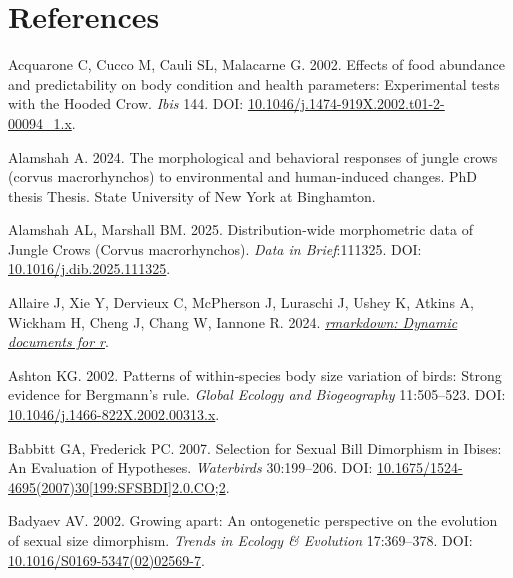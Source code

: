 \documentclass[10pt,a4paper]{article}
\newlength{\cslhangindent}
\newenvironment{CSLReferences}[2] %
 {\begin{list}{}{%
  \setlength{\itemindent}{0pt}
  \setlength{\leftmargin}{0pt}
  \setlength{\parsep}{0pt}
  \ifodd #1
   \setlength{\leftmargin}{\cslhangindent}
   \setlength{\itemindent}{-1\cslhangindent}
  \fi
  \setlength{\itemsep}{#2\baselineskip}}}
 {\end{list}}
\begin{document}
\clearpage

\section*{References}\label{references}

\label{refs}
\begin{CSLReferences}{1}{0}
Acquarone C, Cucco M, Cauli SL, Malacarne G. 2002. Effects of food abundance and predictability on body condition and health parameters: Experimental tests with the {Hooded} {Crow}. \emph{Ibis} 144. DOI: \href{https://doi.org/10.1046/j.1474-919X.2002.t01-2-00094_1.x}{10.1046/j.1474-919X.2002.t01-2-00094\_1.x}.

Alamshah A. 2024. The morphological and behavioral responses of jungle crows (corvus macrorhynchos) to environmental and human-induced changes. PhD thesis Thesis. State University of New York at Binghamton.

Alamshah AL, Marshall BM. 2025. Distribution-wide morphometric data of {Jungle} {Crows} ({Corvus} macrorhynchos). \emph{Data in Brief}:111325. DOI: \href{https://doi.org/10.1016/j.dib.2025.111325}{10.1016/j.dib.2025.111325}.

Allaire J, Xie Y, Dervieux C, McPherson J, Luraschi J, Ushey K, Atkins A, Wickham H, Cheng J, Chang W, Iannone R. 2024. \emph{\href{https://github.com/rstudio/rmarkdown}{{rmarkdown}: Dynamic documents for r}}.

Ashton KG. 2002. Patterns of within‐species body size variation of birds: Strong evidence for {Bergmann}'s rule. \emph{Global Ecology and Biogeography} 11:505--523. DOI: \href{https://doi.org/10.1046/j.1466-822X.2002.00313.x}{10.1046/j.1466-822X.2002.00313.x}.

Babbitt GA, Frederick PC. 2007. Selection for {Sexual} {Bill} {Dimorphism} in {Ibises}: {An} {Evaluation} of {Hypotheses}. \emph{Waterbirds} 30:199--206. DOI: \href{https://doi.org/10.1675/1524-4695(2007)30\%5B199:SFSBDI\%5D2.0.CO;2}{10.1675/1524-4695(2007)30{[}199:SFSBDI{]}2.0.CO;2}.

Badyaev AV. 2002. Growing apart: An ontogenetic perspective on the evolution of sexual size dimorphism. \emph{Trends in Ecology \& Evolution} 17:369--378. DOI: \href{https://doi.org/10.1016/S0169-5347(02)02569-7}{10.1016/S0169-5347(02)02569-7}.


\end{CSLReferences}
\end{document}

